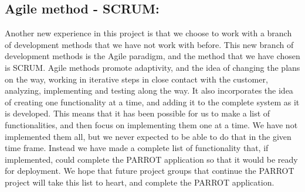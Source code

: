 \subsection*{Agile method - SCRUM:}
Another new experience in this project is that we choose to work with a branch of development methods that we have not work with before. 
This new branch of development methods is the Agile paradigm, and the method that we have chosen is SCRUM. 
Agile methods promote adaptivity, and the idea of changing the plans on the way, working in iterative steps in close contact with the customer, analyzing, implementing and testing along the way. 
It also incorporates the idea of creating one functionality at a time, and adding it to the complete system as it is developed. 
This means that it has been possible for us to make a list of functionalities, and then focus on implementing them one at a time.\newline
We have not implemented them all, but we never expected to be able to do that in the given time frame.
Instead we have made a complete list of functionality that, if implemented, could complete the PARROT application so that it would be ready for deployment.
We hope that future project groups that continue the PARROT project will take this list to heart, and complete the PARROT application.\newline

